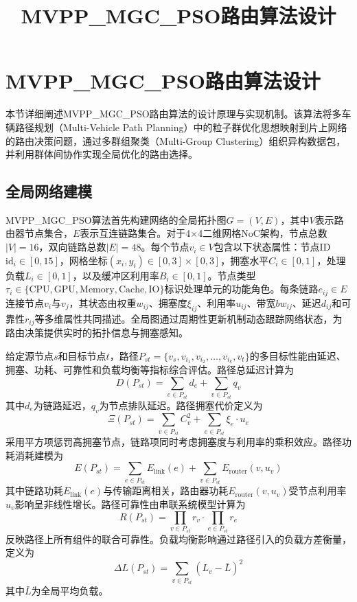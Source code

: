 \documentclass[11pt,a4paper]{article}
\title{\textbf{MVPP\_MGC\_PSO路由算法设计}}
\author{}
\date{}
\begin{document}
\maketitle

\section{MVPP\_MGC\_PSO路由算法设计}

本节详细阐述MVPP\_MGC\_PSO路由算法的设计原理与实现机制。该算法将多车辆路径规划（Multi-Vehicle Path Planning）中的粒子群优化思想映射到片上网络的路由决策问题，通过多群组聚类（Multi-Group Clustering）组织异构数据包，并利用群体间协作实现全局优化的路由选择。

\subsection{全局网络建模}

MVPP\_MGC\_PSO算法首先构建网络的全局拓扑图$G = (V, E)$，其中$V$表示路由器节点集合，$E$表示互连链路集合。对于4$\times$4二维网格NoC架构，节点总数$|V| = 16$，双向链路总数$|E| = 48$。每个节点$v_i \in V$包含以下状态属性：节点ID $\text{id}_i \in [0, 15]$，网格坐标$(x_i, y_i) \in [0, 3] \times [0, 3]$，拥塞水平$C_i \in [0, 1]$，处理负载$L_i \in [0, 1]$，以及缓冲区利用率$B_i \in [0, 1]$。节点类型$\tau_i \in \{\text{CPU}, \text{GPU}, \text{Memory}, \text{Cache}, \text{IO}\}$标识处理单元的功能角色。每条链路$e_{ij} \in E$连接节点$v_i$与$v_j$，其状态由权重$w_{ij}$、拥塞度$\xi_{ij}$、利用率$u_{ij}$、带宽$bw_{ij}$、延迟$d_{ij}$和可靠性$r_{ij}$等多维属性共同描述。全局图通过周期性更新机制动态跟踪网络状态，为路由决策提供实时的拓扑信息与拥塞感知。

给定源节点$s$和目标节点$t$，路径$P_{st} = \{v_s, v_{i_1}, v_{i_2}, \ldots, v_{i_k}, v_t\}$的多目标性能由延迟、拥塞、功耗、可靠性和负载均衡等指标综合评估。路径总延迟计算为
\begin{equation}
D(P_{st}) = \sum_{e \in P_{st}} d_e + \sum_{v \in P_{st}} q_v
\end{equation}
其中$d_e$为链路延迟，$q_v$为节点排队延迟。路径拥塞代价定义为
\begin{equation}
\Xi(P_{st}) = \sum_{v \in P_{st}} C_v^2 + \sum_{e \in P_{st}} \xi_e \cdot u_e
\end{equation}
采用平方项惩罚高拥塞节点，链路项同时考虑拥塞度与利用率的乘积效应。路径功耗消耗建模为
\begin{equation}
E(P_{st}) = \sum_{e \in P_{st}} E_{\text{link}}(e) + \sum_{v \in P_{st}} E_{\text{router}}(v, u_v)
\end{equation}
其中链路功耗$E_{\text{link}}(e)$与传输距离相关，路由器功耗$E_{\text{router}}(v, u_v)$受节点利用率$u_v$影响呈非线性增长。路径可靠性由串联系统模型计算为
\begin{equation}
R(P_{st}) = \prod_{v \in P_{st}} r_v \cdot \prod_{e \in P_{st}} r_e
\end{equation}
反映路径上所有组件的联合可靠性。负载均衡影响通过路径引入的负载方差衡量，定义为
\begin{equation}
\Delta L(P_{st}) = \sum_{v \in P_{st}} (L_v - \bar{L})^2
\end{equation}
其中$\bar{L}$为全局平均负载。
\end{document}
